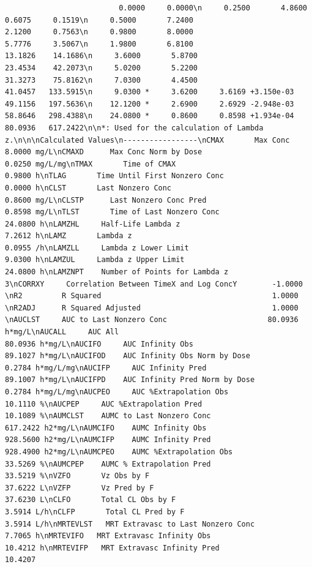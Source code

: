 \documentclass[]{krantz}
\theoremstyle{definition}
\theoremstyle{definition}
\theoremstyle{definition}
\theoremstyle{remark}
\begin{document}
\begin{verbatim}
                          0.0000     0.0000\n     0.2500       4.8600                           0.6075     0.1519\n     0.5000       7.2400                           2.1200     0.7563\n     0.9800       8.0000                           5.7776     3.5067\n     1.9800       6.8100                          13.1826    14.1686\n     3.6000       5.8700                          23.4534    42.2073\n     5.0200       5.2200                          31.3273    75.8162\n     7.0300       4.4500                          41.0457   133.5915\n     9.0300 *     3.6200     3.6169 +3.150e-03    49.1156   197.5636\n    12.1200 *     2.6900     2.6929 -2.948e-03    58.8646   298.4388\n    24.0800 *     0.8600     0.8598 +1.934e-04    80.0936   617.2422\n\n*: Used for the calculation of Lambda z.\n\n\nCalculated Values\n-----------------\nCMAX       Max Conc                                        8.0000 mg/L\nCMAXD      Max Conc Norm by Dose                           0.0250 mg/L/mg\nTMAX       Time of CMAX                                    0.9800 h\nTLAG       Time Until First Nonzero Conc                   0.0000 h\nCLST       Last Nonzero Conc                               0.8600 mg/L\nCLSTP      Last Nonzero Conc Pred                          0.8598 mg/L\nTLST       Time of Last Nonzero Conc                      24.0800 h\nLAMZHL     Half-Life Lambda z                              7.2612 h\nLAMZ       Lambda z                                        0.0955 /h\nLAMZLL     Lambda z Lower Limit                            9.0300 h\nLAMZUL     Lambda z Upper Limit                           24.0800 h\nLAMZNPT    Number of Points for Lambda z                   3\nCORRXY     Correlation Between TimeX and Log ConcY        -1.0000 \nR2         R Squared                                       1.0000 \nR2ADJ      R Squared Adjusted                              1.0000 \nAUCLST     AUC to Last Nonzero Conc                       80.0936 h*mg/L\nAUCALL     AUC All                                        80.0936 h*mg/L\nAUCIFO     AUC Infinity Obs                               89.1027 h*mg/L\nAUCIFOD    AUC Infinity Obs Norm by Dose                   0.2784 h*mg/L/mg\nAUCIFP     AUC Infinity Pred                              89.1007 h*mg/L\nAUCIFPD    AUC Infinity Pred Norm by Dose                  0.2784 h*mg/L/mg\nAUCPEO     AUC %Extrapolation Obs                         10.1110 %\nAUCPEP     AUC %Extrapolation Pred                        10.1089 %\nAUMCLST    AUMC to Last Nonzero Conc                     617.2422 h2*mg/L\nAUMCIFO    AUMC Infinity Obs                             928.5600 h2*mg/L\nAUMCIFP    AUMC Infinity Pred                            928.4900 h2*mg/L\nAUMCPEO    AUMC %Extrapolation Obs                        33.5269 %\nAUMCPEP    AUMC % Extrapolation Pred                      33.5219 %\nVZFO       Vz Obs by F                                    37.6222 L\nVZFP       Vz Pred by F                                   37.6230 L\nCLFO       Total CL Obs by F                               3.5914 L/h\nCLFP       Total CL Pred by F                              3.5914 L/h\nMRTEVLST   MRT Extravasc to Last Nonzero Conc              7.7065 h\nMRTEVIFO   MRT Extravasc Infinity Obs                     10.4212 h\nMRTEVIFP   MRT Extravasc Infinity Pred                    10.4207 
\end{verbatim}
\end{document}
